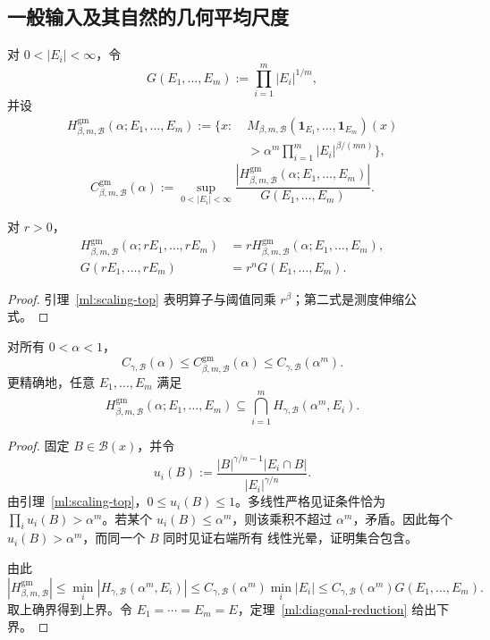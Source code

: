 \subsection{一般输入及其自然的几何平均尺度}

\begin{definition}[几何平均归一化]\label{ml:geometric-mean}
对 $0<|E_i|<\infty$，令
\[
 G(E_1,\ldots,E_m):=\prod_{i=1}^m|E_i|^{1/m},
\]
并设
\[
 \begin{split}
 H^{\mathrm{gm}}_{\beta,m,\mathcal B}(\alpha;E_1,\ldots,E_m)
 :=\biggl\{x:\;&M_{\beta,m,\mathcal B}(\mathbf1_{E_1},\ldots,\mathbf1_{E_m})(x)\\
 &>\alpha^m\prod_{i=1}^m|E_i|^{\beta/(mn)}\biggr\},
 \end{split}
\]
\[
 C^{\mathrm{gm}}_{\beta,m,\mathcal B}(\alpha)
 :=\sup_{0<|E_i|<\infty}
 \frac{|H^{\mathrm{gm}}_{\beta,m,\mathcal B}(\alpha;E_1,\ldots,E_m)|}
 {G(E_1,\ldots,E_m)}.
\]
\end{definition}

\begin{lemma}[尺度不变性]\label{ml:gm-scaling}
对 $r>0$，
\begin{align*}
 H^{\mathrm{gm}}_{\beta,m,\mathcal B}(\alpha;rE_1,\ldots,rE_m)
 &=rH^{\mathrm{gm}}_{\beta,m,\mathcal B}(\alpha;E_1,\ldots,E_m),\\
 G(rE_1,\ldots,rE_m)&=r^nG(E_1,\ldots,E_m).
\end{align*}
\end{lemma}

\begin{proof}
引理~\ref{ml:scaling-top} 表明算子与阈值同乘 $r^\beta$；第二式是测度伸缩公式。
\end{proof}

\begin{theorem}[一般输入的精确夹逼]\label{ml:general-sandwich}
对所有 $0<\alpha<1$，
\[
 C_{\gamma,\mathcal B}(\alpha)
 \leq C^{\mathrm{gm}}_{\beta,m,\mathcal B}(\alpha)
 \leq C_{\gamma,\mathcal B}(\alpha^m).
\]
更精确地，任意 $E_1,\ldots,E_m$ 满足
\[
 H^{\mathrm{gm}}_{\beta,m,\mathcal B}(\alpha;E_1,\ldots,E_m)
 \subseteq\bigcap_{i=1}^m H_{\gamma,\mathcal B}(\alpha^m,E_i).
\]
\end{theorem}

\begin{proof}
固定 $B\in\mathcal B(x)$，并令
\[
 u_i(B):=\frac{|B|^{\gamma/n-1}|E_i\cap B|}{|E_i|^{\gamma/n}}.
\]
由引理~\ref{ml:scaling-top}，$0\leq u_i(B)\leq1$。多线性严格见证条件恰为
$\prod_i u_i(B)>\alpha^m$。若某个 $u_i(B)\leq\alpha^m$，则该乘积不超过
$\alpha^m$，矛盾。因此每个 $u_i(B)>\alpha^m$，而同一个 $B$ 同时见证右端所有
线性光晕，证明集合包含。

由此
\[
 |H^{\mathrm{gm}}_{\beta,m,\mathcal B}|
 \leq\min_i|H_{\gamma,\mathcal B}(\alpha^m,E_i)|
 \leq C_{\gamma,\mathcal B}(\alpha^m)\min_i|E_i|
 \leq C_{\gamma,\mathcal B}(\alpha^m)G(E_1,\ldots,E_m).
\]
取上确界得到上界。令 $E_1=\cdots=E_m=E$，定理~\ref{ml:diagonal-reduction}
给出下界。
\end{proof}

